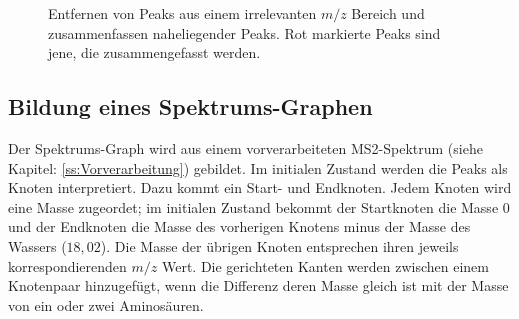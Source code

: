 \documentclass[a4paper, 12pt]{article}
\newcommand{\tikzScale}{1.0}
\newcommand{\massCharge}{$ m/z $ }
\newcommand{\yAxisHeight}{3}
\newcommand{\xAxisLength}{5}
\newcommand{\axisColorOffset}{0.15}
\begin{document}
\begin{figure}[H]
\begin{minipage}[t]{.45\linewidth}
      \end{minipage}
      \caption{Entfernen von Peaks aus einem irrelevanten \massCharge Bereich und zusammenfassen naheliegender Peaks. Rot markierte Peaks sind jene, die zusammengefasst werden.}
\end{figure}

\subsection{Bildung eines Spektrums-Graphen}\label{ss:BildungSpekGraph}
Der Spektrums-Graph wird aus einem vorverarbeiteten MS2-Spektrum (siehe Kapitel: \ref{ss:Vorverarbeitung}) gebildet. Im initialen Zustand werden die Peaks als Knoten interpretiert. Dazu kommt ein Start- und Endknoten. Jedem Knoten wird eine Masse zugeordet; im initialen Zustand bekommt der Startknoten die Masse 0 und der Endknoten die Masse des vorherigen Knotens minus der Masse des Wassers ($ 18,02 $). Die Masse der übrigen Knoten entsprechen ihren jeweils korrespondierenden \massCharge Wert. Die gerichteten Kanten werden zwischen einem Knotenpaar hinzugefügt, wenn die Differenz deren Masse gleich ist mit der Masse von ein oder zwei Aminosäuren.
\end{document}
